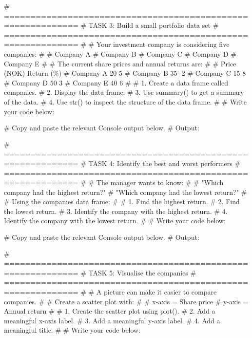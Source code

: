 \documentclass[
  12pt,
  a4paper,
]{scrbook}
\newenvironment{Shaded}{\begin{snugshade}}{\end{snugshade}}
\newcommand{\AlertTok}[1]{\textcolor[rgb]{0.68,0.00,0.00}{#1}}
\newcommand{\CommentTok}[1]{\textcolor[rgb]{0.37,0.37,0.37}{#1}}
\theoremstyle{plain}
\theoremstyle{definition}
\theoremstyle{remark}
\begin{document}
\begin{Shaded}
\begin{Highlighting}[]
\CommentTok{\# ============================================================}
\CommentTok{\# }\AlertTok{TASK}\CommentTok{ 3: Build a small portfolio data set}
\CommentTok{\# ============================================================}
\CommentTok{\#}
\CommentTok{\# Your investment company is considering five companies:}
\CommentTok{\#}
\CommentTok{\# Company A}
\CommentTok{\# Company B}
\CommentTok{\# Company C}
\CommentTok{\# Company D}
\CommentTok{\# Company E}
\CommentTok{\#}
\CommentTok{\# The current share prices and annual returns are:}
\CommentTok{\#}
\CommentTok{\#             Price (NOK)     Return (\%)}
\CommentTok{\# Company A       20              5}
\CommentTok{\# Company B       35             {-}2}
\CommentTok{\# Company C       15              8}
\CommentTok{\# Company D       50              3}
\CommentTok{\# Company E       40              6}
\CommentTok{\#}
\CommentTok{\# 1. Create a data frame called \textasciigrave{}companies\textasciigrave{}.}
\CommentTok{\# 2. Display the data frame.}
\CommentTok{\# 3. Use \textasciigrave{}summary()\textasciigrave{} to get a summary of the data.}
\CommentTok{\# 4. Use \textasciigrave{}str()\textasciigrave{} to inspect the structure of the data frame.}
\CommentTok{\#}
\CommentTok{\# Write your code below:}


\CommentTok{\# Copy and paste the relevant Console output below.}
\CommentTok{\# Output:}


\CommentTok{\# ============================================================}
\CommentTok{\# }\AlertTok{TASK}\CommentTok{ 4: Identify the best and worst performers}
\CommentTok{\# ============================================================}
\CommentTok{\#}
\CommentTok{\# The manager wants to know:}
\CommentTok{\#}
\CommentTok{\# "Which company had the highest return?"}
\CommentTok{\# "Which company had the lowest return?"}
\CommentTok{\#}
\CommentTok{\# Using the \textasciigrave{}companies\textasciigrave{} data frame:}
\CommentTok{\#}
\CommentTok{\# 1. Find the highest return.}
\CommentTok{\# 2. Find the lowest return.}
\CommentTok{\# 3. Identify the company with the highest return.}
\CommentTok{\# 4. Identify the company with the lowest return.}
\CommentTok{\#}
\CommentTok{\# Write your code below:}


\CommentTok{\# Copy and paste the relevant Console output below.}
\CommentTok{\# Output:}


\CommentTok{\# ============================================================}
\CommentTok{\# }\AlertTok{TASK}\CommentTok{ 5: Visualise the companies}
\CommentTok{\# ============================================================}
\CommentTok{\#}
\CommentTok{\# A picture can make it easier to compare companies.}
\CommentTok{\#}
\CommentTok{\# Create a scatter plot with:}
\CommentTok{\#}
\CommentTok{\#     x{-}axis = Share price}
\CommentTok{\#     y{-}axis = Annual return}
\CommentTok{\#}
\CommentTok{\# 1. Create the scatter plot using \textasciigrave{}plot()\textasciigrave{}.}
\CommentTok{\# 2. Add a meaningful x{-}axis label.}
\CommentTok{\# 3. Add a meaningful y{-}axis label.}
\CommentTok{\# 4. Add a meaningful title.}
\CommentTok{\#}
\CommentTok{\# Write your code below:}



\end{Highlighting}
\end{Shaded}
\end{document}
